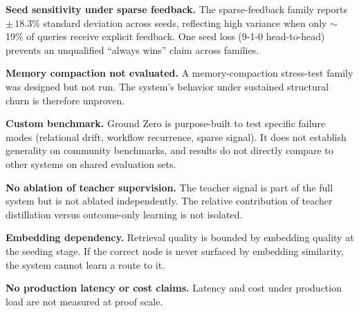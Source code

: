 \documentclass[11pt]{article}
\begin{document}
\textbf{Seed sensitivity under sparse feedback.} The sparse-feedback family
reports $\pm\,18.3$\% standard deviation across seeds, reflecting high variance
when only $\sim$19\% of queries receive explicit feedback. One seed loss
(9-1-0 head-to-head) prevents an unqualified ``always wins'' claim across
families.

\textbf{Memory compaction not evaluated.} A memory-compaction stress-test family
was designed but not run. The system's behavior under sustained structural churn
is therefore unproven.

\textbf{Custom benchmark.} Ground Zero is purpose-built to test specific failure
modes (relational drift, workflow recurrence, sparse signal). It does not
establish generality on community benchmarks, and results do not directly compare
to other systems on shared evaluation sets.

\textbf{No ablation of teacher supervision.} The teacher signal is part of the
full system but is not ablated independently. The relative contribution of
teacher distillation versus outcome-only learning is not isolated.

\textbf{Embedding dependency.} Retrieval quality is bounded by embedding quality
at the seeding stage. If the correct node is never surfaced by embedding
similarity, the system cannot learn a route to it.

\textbf{No production latency or cost claims.} Latency and cost under production
load are not measured at proof scale.
\end{document}
